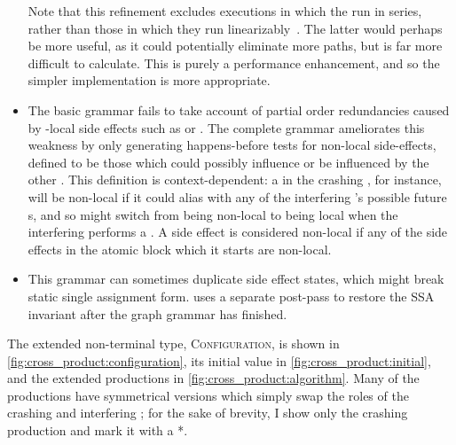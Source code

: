\begin{itemize}
  Note that this refinement excludes executions in which the
  {\StateMachines} run in series, rather than those in which they run
  linearizably~\cite{Herlihy1990}.  The latter would perhaps be more
  useful, as it could potentially eliminate more paths, but is far
  more difficult to calculate.  This is purely a performance
  enhancement, and so the simpler implementation is more appropriate.
\item The basic grammar fails to take account of partial order
  redundancies caused by {\StateMachine}-local side effects such as
   or .  The complete grammar ameliorates
  this weakness by only generating happens-before tests for non-local
  side-effects, defined to be those which could possibly influence or
  be influenced by the other {\StateMachine}.  This definition is
  context-dependent: a  in the crashing {\StateMachine},
  for instance, will be non-local if it could alias with any of the
  interfering {\StateMachine}'s possible future s, and so
  might switch from being non-local to being local when the
  interfering {\StateMachine} performs a .  A
  {\stStartAtomic} side effect is considered non-local if any of the
  side effects in the atomic block which it starts are non-local.
\item This grammar can sometimes duplicate side effect states, which
  might break static single assignment form.  {\Technique} uses a
  separate post-pass to restore the SSA invariant after the graph
  grammar has finished.
\end{itemize}
The extended non-terminal type, \textsc{Configuration}, is shown in
\autoref{fig:cross_product:configuration}, its initial value in
\autoref{fig:cross_product:initial}, and the extended productions in
\autoref{fig:cross_product:algorithm}.  Many of the productions have
symmetrical versions which simply swap the roles of the crashing and
interfering {\StateMachines}; for the sake of brevity, I show only the
crashing {\StateMachine} production and mark it with a *.

